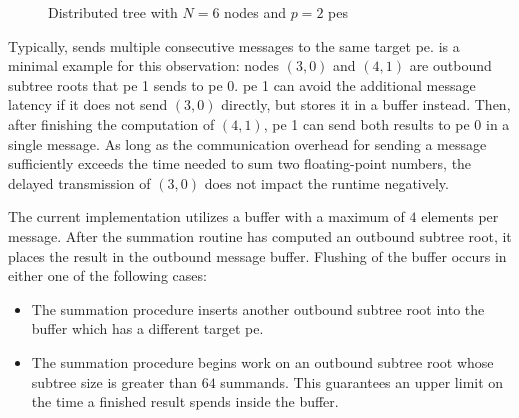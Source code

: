 \begin{figure}
\centering
{}
\caption{Distributed tree with $N=6$ nodes and $p=2$ \glspl{pe}}
\label{fig:messageBufferingTree}
\end{figure}

Typically,  sends multiple consecutive messages to the same target \gls{pe}.
 is a minimal example for this observation: nodes $(3,0)$ and $(4,1)$ are outbound subtree roots that \gls{pe} 1 sends to \gls{pe} 0.
\gls{pe} 1 can avoid the additional message latency if it does not send $(3,0)$ directly, but stores it in a buffer instead.
Then, after finishing the computation of $(4,1)$, \gls{pe} 1 can send both results to \gls{pe} 0 in a single message.
As long as the communication overhead for sending a message sufficiently exceeds the time needed to sum two floating-point numbers, the delayed transmission of $(3,0)$ does not impact the runtime negatively.

The current implementation utilizes a buffer with a maximum of $4$ elements per message.
After the summation routine has computed an outbound subtree root, it places the result in the outbound message buffer.
Flushing of the buffer occurs in either one of the following cases: \begin{itemize} 
\item The summation procedure inserts another outbound subtree root into the buffer which has a different target \gls{pe}.
\item The summation procedure begins work on an outbound subtree root whose subtree size is greater than $64$ summands. This guarantees an upper limit on the time a finished result spends inside the buffer.
\end{itemize}

